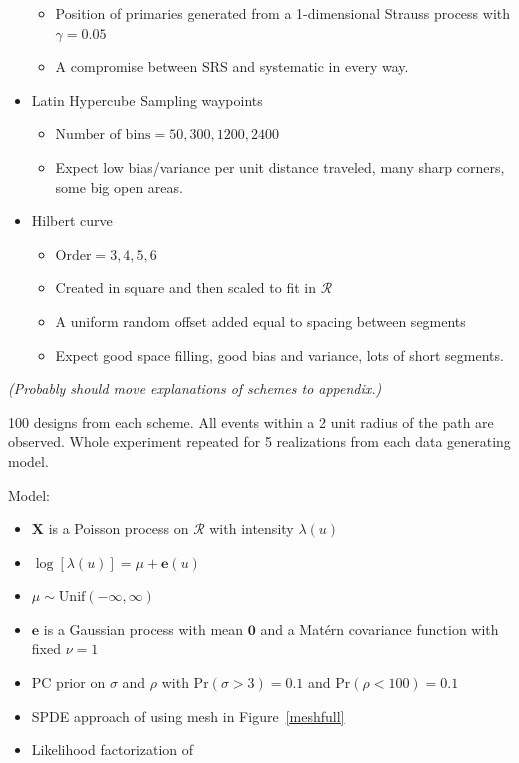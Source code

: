 \documentclass[review]{elsarticle}
\begin{document}
\begin{itemize}
\begin{itemize}
\item Position of primaries generated from a 1-dimensional Strauss process with
\(\gamma = 0.05\)
\item A compromise between SRS and systematic in every way.
\end{itemize}
\item Latin Hypercube Sampling waypoints
\begin{itemize}
\item \(\text{Number of bins} = 50, 300, 1200, 2400\)
\item Expect low bias/variance per unit distance traveled, many sharp corners,
some big open areas.
\end{itemize}
\item Hilbert curve
\begin{itemize}
\item \(\text{Order} = 3, 4, 5, 6\)
\item Created in square and then scaled to fit in \(\mathcal{R}\)
\item A uniform random offset added equal to spacing between segments
\item Expect good space filling, good bias and variance, lots of short
segments.
\end{itemize}
\end{itemize}

{\it (Probably should move explanations of schemes to appendix.)}

100 designs from each scheme. All events within a 2 unit radius of the path are
observed. Whole experiment repeated for 5 realizations from each data
generating model.

Model:

\begin{itemize}
\item \(\mathbf{X}\) is a Poisson process on \(\mathcal{R}\) with intensity
\(\lambda(u)\)
\item \(\log[\lambda(u)] = \mu + \mathbf{e}(u)\)
\item \(\mu \sim \mathrm{Unif}(-\infty, \infty)\)
\item \(\mathbf{e}\) is a Gaussian process with mean \(\mathbf{0}\) and a
Mat\'{e}rn covariance function with fixed \(\nu = 1\)
\item PC prior on \(\sigma\) and \(\rho\) with \(\mathrm{Pr}(\sigma > 3) = 0.1\)
and \(\mathrm{Pr}(\rho < 100) = 0.1\) \citep{fuglstadetal,simpsonpc}
\item SPDE approach of \citet{lindgrenetal} using mesh in Figure~\ref{meshfull}
\item Likelihood factorization of \citet{simpsonetal}
\end{itemize}
\end{document}
